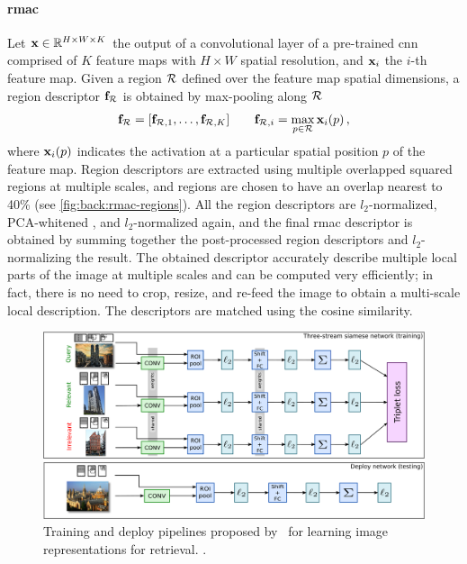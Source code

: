 \paragraph{\acrlong{rmac}}
Let $\mathbf{x} \in \mathbb{R}^{H \times W \times K}$ the output of a convolutional layer of a pre-trained \gls{cnn} comprised of $K$ feature maps with $H \times W$ spatial resolution, and $\mathbf{x}_i$ the $i$-th feature map.
Given a region $\mathcal{R}$ defined over the feature map spatial dimensions, a region descriptor $\mathbf{f}_{\mathcal{R}}$ is obtained by max-pooling along $\mathcal{R}$
\begin{equation} \label{eq:back:rmac-region}
\mathbf{f}_{\mathcal{R}} = [\mathbf{f}_{\mathcal{R},1}, \ldots, \mathbf{f}_{\mathcal{R},K}] \qquad \mathbf{f}_{\mathcal{R},i} = \max_{p \in \mathcal{R}} \mathbf{x}_i(p) \,,
\end{equation}
where $\mathbf{x}_i(p)$ indicates the activation at a particular spatial position $p$ of the feature map.
Region descriptors are extracted using multiple overlapped squared regions at multiple scales, and regions are chosen to have an overlap nearest to 40\% (see \ref{fig:back:rmac-regions}).
All the region descriptors are $l_2$-normalized, PCA-whitened%
, and $l_2$-normalized again, and the final \gls{rmac} descriptor is obtained by summing together the post-processed region descriptors and $l_2$-normalizing the result.
The obtained descriptor accurately describe multiple local parts of the image at multiple scales and can be computed very efficiently;
in fact, there is no need to crop, resize, and re-feed the image to obtain a multi-scale local description.
The descriptors are matched using the cosine similarity.

\begin{figure}
    \centering
    \includegraphics[width=\linewidth]{rmac-trained}
    \caption{Training and deploy pipelines proposed by~\citet{gordo2016deep,gordo2017end} for learning image representations for retrieval. .}
    \label{fig:back:rmac-trained}
\end{figure}

